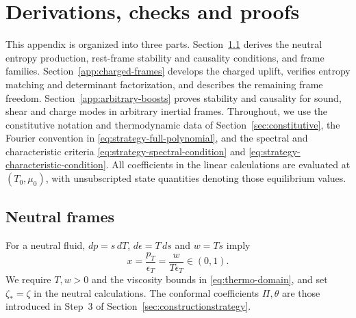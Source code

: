 \appendix
\setcounter{secnumdepth}{3}
\hypersetup{bookmarksdepth=3}
\section{Derivations, checks and proofs}\label{app:proofs}

This appendix is organized into three parts.
Section~\ref{app:neutral-frames} derives the neutral entropy production,
rest-frame stability and causality conditions, and frame families.
Section~\ref{app:charged-frames} develops the charged uplift, verifies
entropy matching and determinant factorization, and describes the
remaining frame freedom.
Section~\ref{app:arbitrary-boosts} proves stability and causality for
sound, shear and charge modes in arbitrary inertial frames. Throughout, we use the constitutive notation and thermodynamic data of
Section~\ref{sec:constitutive}, the Fourier convention in
\eqref{eq:strategy-full-polynomial}, and the spectral and characteristic
criteria \eqref{eq:strategy-spectral-condition} and
\eqref{eq:strategy-characteristic-condition}. All coefficients in the
linear calculations are evaluated at $(T_0,\mu_0)$, with unsubscripted
state quantities denoting those equilibrium values.

\subsection{Neutral frames}\label{app:neutral-frames}
For a neutral fluid, $dp=s\,dT$, $d\epsilon=T\,ds$ and $w=Ts$ imply
\begin{equation}\label{app:neutral-domain}
 x=\frac{p_T}{\epsilon_T}=\frac{w}{T\epsilon_T}\in(0,1).
\end{equation}
We require $T,w>0$ and the viscosity bounds in \eqref{eq:thermo-domain},
and set $\zeta_*=\zeta$ in the neutral calculations.
The conformal coefficients $\Pi,\theta$ are those introduced in Step~3
of Section~\ref{sec:constructionstrategy}.

